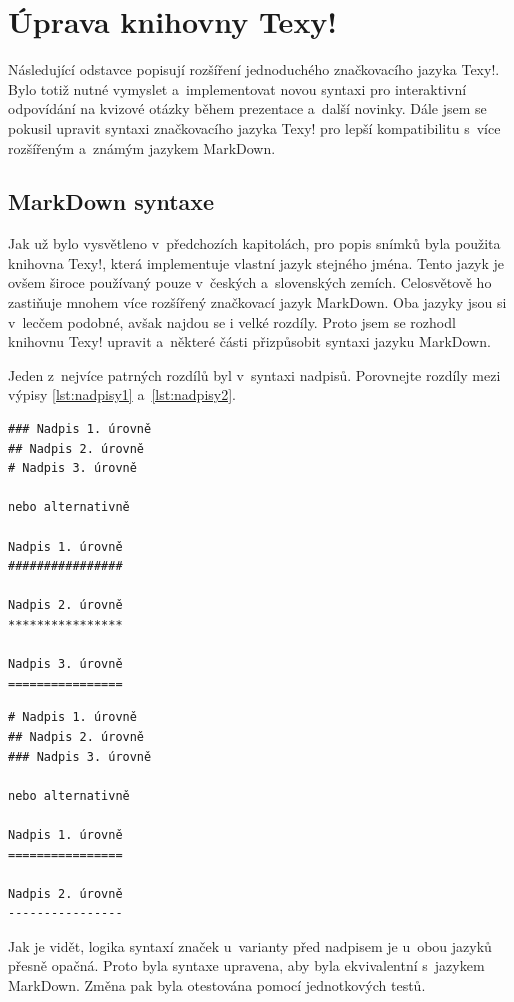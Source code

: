 \documentclass[11pt,twoside,a4paper]{book}
\begin{document}
\section{Úprava knihovny Texy!}
Následující odstavce popisují rozšíření jednoduchého značkovacího jazyka Texy!. Bylo totiž nutné vymyslet a~imple\-mentovat novou syntaxi pro interaktivní odpovídání na kvizové otázky během prezentace a~další novinky. Dále jsem se pokusil upravit syntaxi značkovacího jazyka Texy! pro lepší kompatibilitu s~více rozšířeným a~známým jazykem Mark\-Down.

\subsection{Mark\-Down syntaxe}
Jak už bylo vysvětleno v~předchozích kapitolách, pro popis snímků byla použita knihovna Texy!, která imple\-mentuje vlastní jazyk stejného jména. Tento jazyk je ovšem široce používaný pouze v~českých a~slovenských zemích. Celosvětově ho zastiňuje mnohem více rozšířený značkovací jazyk Mark\-Down. Oba jazyky jsou si v~lecčem podobné, avšak najdou se i velké rozdíly. Proto jsem se rozhodl knihovnu Texy! upravit a~některé části přizpůsobit syntaxi jazyku Mark\-Down.

Jeden z~nejvíce patrných rozdílů byl v~syntaxi nadpisů. Porovnejte rozdíly mezi výpisy \ref{lst:nadpisy1} a~\ref{lst:nadpisy2}.

\begin{lstlisting}[caption=Ukázka nadpisů v~Texy!,label={lst:nadpisy1},captionpos=b]
### Nadpis 1. úrovně
## Nadpis 2. úrovně
# Nadpis 3. úrovně

nebo alternativně

Nadpis 1. úrovně
################

Nadpis 2. úrovně
****************

Nadpis 3. úrovně
================
\end{lstlisting}

\begin{lstlisting}[caption=Ukázka nadpisů v~Mark\-Down,label={lst:nadpisy2},captionpos=b]
# Nadpis 1. úrovně
## Nadpis 2. úrovně
### Nadpis 3. úrovně

nebo alternativně

Nadpis 1. úrovně
================

Nadpis 2. úrovně
----------------
\end{lstlisting}

Jak je vidět, logika syntaxí značek u~varianty před nadpisem je u~obou jazyků přesně opačná. Proto byla syntaxe upravena, aby byla ekvivalentní s~jazykem Mark\-Down. Změna pak byla otestována pomocí jednotkových testů.
\end{document}
